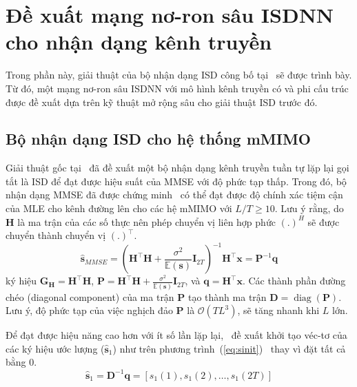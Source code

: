\section{Đề xuất mạng nơ-ron sâu ISDNN cho nhận dạng kênh truyền}

Trong phần này, giải thuật của bộ nhận dạng ISD công bố tại~\cite{Mandloi2017} sẽ được trình bày. Từ đó, một mạng nơ-ron sâu ISDNN với mô hình kênh truyền có và phi cấu trúc được đề xuất dựa trên kỹ thuật mở rộng sâu cho giải thuật ISD trước đó.

\subsection{Bộ nhận dạng ISD cho hệ thống mMIMO}

Giải thuật gốc tại~\cite{Mandloi2017} đã đề xuất một bộ nhận dạng kênh truyền tuần tự lặp lại gọi tắt là ISD để đạt được hiệu suất của MMSE với độ phức tạp thấp. Trong đó, bộ nhận dạng MMSE đã được chứng minh~\cite{Rusek2013} có thể đạt được độ chính xác tiệm cận của MLE cho kênh đường lên cho các hệ mMIMO với $L/T \ge 10$. Lưu ý rằng, do $\mathbf{H}$ là ma trận của các số thực nên phép chuyển vị liên hợp phức $(.)^H$ sẽ được chuyển thành chuyển vị $(.)^\top$.
\begin{equation}
    \hat{\mathbf{s}}_{MMSE}=\left(\mathbf{H}^\top \mathbf{H}+\frac{\sigma^2}{\mathbb{E}(\mathbf{s})} \mathbf{I}_{2T}\right)^{-1} \mathbf{H}^\top \mathbf{x}=\mathbf{P}^{-1} \mathbf{q}
\end{equation}
ký hiệu $\mathbf{G}_\mathbf{H} = \mathbf{H}^\top \mathbf{H}$, $\mathbf{P} = \mathbf{H}^\top \mathbf{H}+\frac{\sigma^2}{\mathbb{E}(\mathbf{s})} \mathbf{I}_{2T}$, và $\mathbf{q} = \mathbf{H}^\top \mathbf{x}$. 
Các thành phần đường chéo (diagonal component) của ma trận $\mathbf{P}$ tạo thành ma trận $\mathbf{D} = \operatorname{diag}(\mathbf{P})$.
Lưu ý, độ phức tạp của việc nghịch đảo $\mathbf{P}$ là $\mathcal{O}(TL^3)$, sẽ tăng nhanh khi $L$ lớn. 

Để đạt được hiệu năng cao hơn với ít số lần lặp lại,~\cite{Mandloi2017} đề xuất khởi tạo véc-tơ của các ký hiệu ước lượng ($\hat{\mathbf{s}}_1$) như trên phương trình~(\ref{eq:sinit})~\cite{Gao2014} thay vì đặt tất cả bằng $0$.
\begin{equation}
\label{eq:sinit}
    \hat{\mathbf{s}}_1=\mathbf{D}^{-1} \mathbf{q}=\left[s_1(1), s_1(2), \ldots, s_1(2T)\right]
\end{equation}

